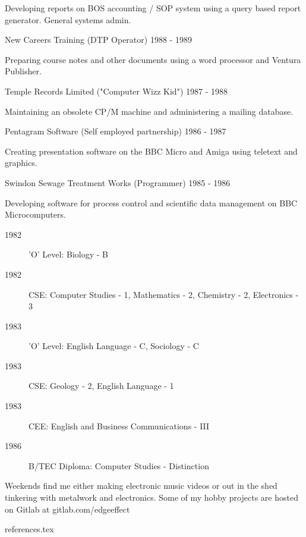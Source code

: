 Developing reports on BOS accounting / SOP system
using a query based report generator. General systems admin.

\jobHeading
    {New Careers Training (DTP Operator)}
    {1988 - 1989}

Preparing course notes and other documents
using a word processor and Ventura Publisher.

\jobHeading
    {Temple Records Limited ("Computer Wizz Kid")}
    {1987 - 1988}

Maintaining an obsolete CP/M machine and administering a mailing database.

\jobHeading
    {Pentagram Software (Self employed partnership)}
    {1986 - 1987}

Creating presentation software on the BBC Micro and Amiga
using teletext and graphics.

\jobHeading
    {Swindon Sewage Treatment Works (Programmer)}
    {1985 - 1986}

Developing software for process control and scientific data management
on BBC Microcomputers.



\begin{description}
    \item[1982] 'O' Level: Biology - B
    \item[1982] CSE: Computer Studies - 1, Mathematics - 2,
        Chemistry - 2, Electronics - 3
    \item[1983] 'O' Level: English Language - C, Sociology - C
    \item[1983] CSE: Geology - 2, English Language - 1
    \item[1983] CEE: English and Business Communications - III
\end{description}


\begin{description}
    \item[1986] B/TEC Diploma: Computer Studies - Distinction
\end{description}


Weekends find me either making electronic music videos
or out in the shed tinkering with metalwork and electronics.
Some of my hobby projects are hosted on Gitlab at gitlab.com/edgeeffect


 {references.tex}
